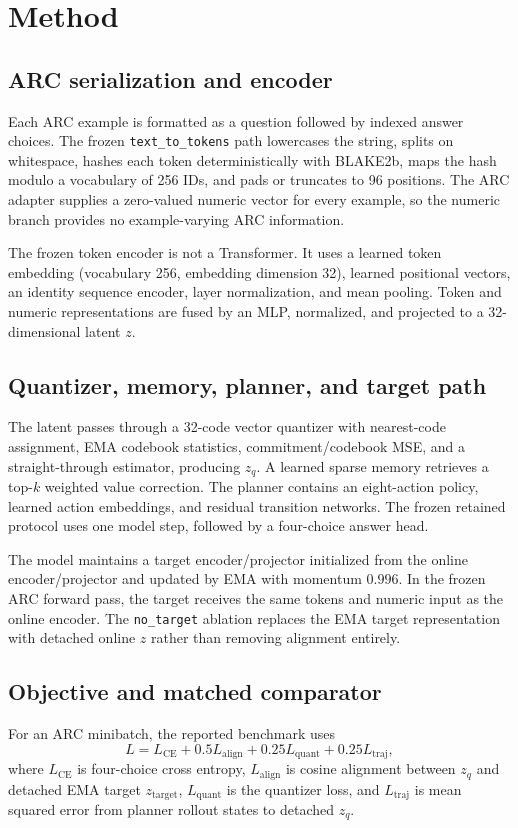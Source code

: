 \documentclass[11pt]{article}
\begin{document}
\section{Method}
\subsection{ARC serialization and encoder}
Each ARC example is formatted as a question followed by indexed answer choices. The frozen \texttt{text\_to\_tokens} path lowercases the string, splits on whitespace, hashes each token deterministically with BLAKE2b, maps the hash modulo a vocabulary of 256 IDs, and pads or truncates to 96 positions. The ARC adapter supplies a zero-valued numeric vector for every example, so the numeric branch provides no example-varying ARC information.

The frozen token encoder is not a Transformer. It uses a learned token embedding (vocabulary 256, embedding dimension 32), learned positional vectors, an identity sequence encoder, layer normalization, and mean pooling. Token and numeric representations are fused by an MLP, normalized, and projected to a 32-dimensional latent $z$.

\subsection{Quantizer, memory, planner, and target path}
The latent passes through a 32-code vector quantizer with nearest-code assignment, EMA codebook statistics, commitment/codebook MSE, and a straight-through estimator, producing $z_q$. A learned sparse memory retrieves a top-$k$ weighted value correction. The planner contains an eight-action policy, learned action embeddings, and residual transition networks. The frozen retained protocol uses one model step, followed by a four-choice answer head.

The model maintains a target encoder/projector initialized from the online encoder/projector and updated by EMA with momentum $0.996$. In the frozen ARC forward pass, the target receives the same tokens and numeric input as the online encoder. The \texttt{no\_target} ablation replaces the EMA target representation with detached online $z$ rather than removing alignment entirely.

\subsection{Objective and matched comparator}
For an ARC minibatch, the reported benchmark uses
\[
L = L_{\mathrm{CE}} + 0.5L_{\mathrm{align}} + 0.25L_{\mathrm{quant}} + 0.25L_{\mathrm{traj}},
\]
where $L_{\mathrm{CE}}$ is four-choice cross entropy, $L_{\mathrm{align}}$ is cosine alignment between $z_q$ and detached EMA target $z_{\mathrm{target}}$, $L_{\mathrm{quant}}$ is the quantizer loss, and $L_{\mathrm{traj}}$ is mean squared error from planner rollout states to detached $z_q$.
\end{document}
